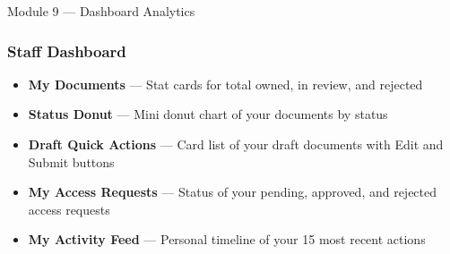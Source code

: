 \begin{ugModule}{Module 9 --- Dashboard Analytics}
  \subsubsection*{Staff Dashboard}
  \begin{itemize}[leftmargin=18pt]
    \item \textbf{My Documents} --- Stat cards for total owned,
      in review, and rejected
    \item \textbf{Status Donut} --- Mini donut chart of your
      documents by status
    \item \textbf{Draft Quick Actions} --- Card list of your
      draft documents with Edit and Submit buttons
    \item \textbf{My Access Requests} --- Status of your pending,
      approved, and rejected access requests
    \item \textbf{My Activity Feed} --- Personal timeline of
      your 15 most recent actions
  \end{itemize}
\end{ugModule}

\vspace{10pt}

